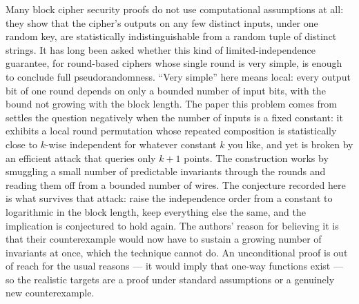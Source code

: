 \documentclass{aicr-conjecture}
\begin{document}

\vspace{0.4em}

\begin{informalconjecture}
Many block cipher security proofs do not use computational assumptions
at all: they show that the cipher's outputs on any few distinct inputs,
under one random key, are statistically indistinguishable from a random
tuple of distinct strings. It has long been asked whether this kind of
limited-independence guarantee, for round-based ciphers whose single
round is very simple, is enough to conclude full pseudorandomness.
``Very simple'' here means local: every output bit of one round depends
on only a bounded number of input bits, with the bound not growing with
the block length. The paper this problem comes from settles the question
negatively when the number of inputs is a fixed constant: it exhibits a
local round permutation whose repeated composition is statistically
close to $k$-wise independent for whatever constant $k$ you like, and
yet is broken by an efficient attack that queries only $k+1$ points. The
construction works by smuggling a small number of predictable invariants
through the rounds and reading them off from a bounded number of wires.
The conjecture recorded here is what survives that attack: raise the
independence order from a constant to logarithmic in the block length,
keep everything else the same, and the implication is conjectured to
hold again. The authors' reason for believing it is that their
counterexample would now have to sustain a growing number of invariants
at once, which the technique cannot do. An unconditional proof is out of
reach for the usual reasons --- it would imply that one-way functions
exist --- so the realistic targets are a proof under standard
assumptions or a genuinely new counterexample.
\end{informalconjecture}
\end{document}

